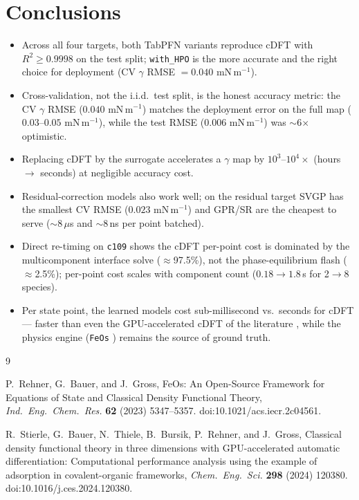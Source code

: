 \documentclass[11pt]{article}
\newcommand{\gmm}{mN\,m$^{-1}$}
\begin{document}
\section{Conclusions}
\begin{itemize}
  \item Across all four targets, both TabPFN variants reproduce cDFT with
        $R^2\ge0.9998$ on the test split; \texttt{with\_HPO} is the more accurate
        and the right choice for deployment (CV $\gamma$ RMSE $=0.040$ \gmm).
  \item Cross-validation, not the i.i.d.\ test split, is the honest accuracy
        metric: the CV $\gamma$ RMSE ($0.040$ \gmm) matches the deployment error
        on the full map ($0.03$--$0.05$ \gmm), while the test RMSE ($0.006$ \gmm)
        was $\sim$6$\times$ optimistic.
  \item Replacing cDFT by the surrogate accelerates a $\gamma$ map by
        $10^3$--$10^4\times$ (hours $\to$ seconds) at negligible accuracy cost.
  \item Residual-correction models also work well; on the residual target SVGP
        has the smallest CV RMSE ($0.023$ \gmm) and GPR/SR are the cheapest to
        serve ($\sim$8\,$\mu$s and $\sim$8\,ns per point batched).
  \item Direct re-timing on \texttt{c109} shows the cDFT per-point cost is
        dominated by the multicomponent interface solve ($\approx$97.5\%), not the
        phase-equilibrium flash ($\approx$2.5\%); per-point cost scales with
        component count ($0.18\to1.8$\,s for 2$\to$8 species).
  \item Per state point, the learned models cost sub-millisecond vs.\ seconds for
        cDFT --- faster than even the GPU-accelerated cDFT of the literature
        \cite{stierle2024gpu}, while the physics engine (\texttt{FeOs}
        \cite{rehner2023feos}) remains the source of ground truth.
\end{itemize}

\begin{thebibliography}{9}

P.~Rehner, G.~Bauer, and J.~Gross,
\newblock FeOs: An Open-Source Framework for Equations of State and Classical
Density Functional Theory,
\newblock \emph{Ind.\ Eng.\ Chem.\ Res.} \textbf{62} (2023) 5347--5357.
\newblock doi:10.1021/acs.iecr.2c04561.

R.~Stierle, G.~Bauer, N.~Thiele, B.~Bursik, P.~Rehner, and J.~Gross,
\newblock Classical density functional theory in three dimensions with
GPU-accelerated automatic differentiation: Computational performance analysis
using the example of adsorption in covalent-organic frameworks,
\newblock \emph{Chem.\ Eng.\ Sci.} \textbf{298} (2024) 120380.
\newblock doi:10.1016/j.ces.2024.120380.

\end{thebibliography}
\end{document}
